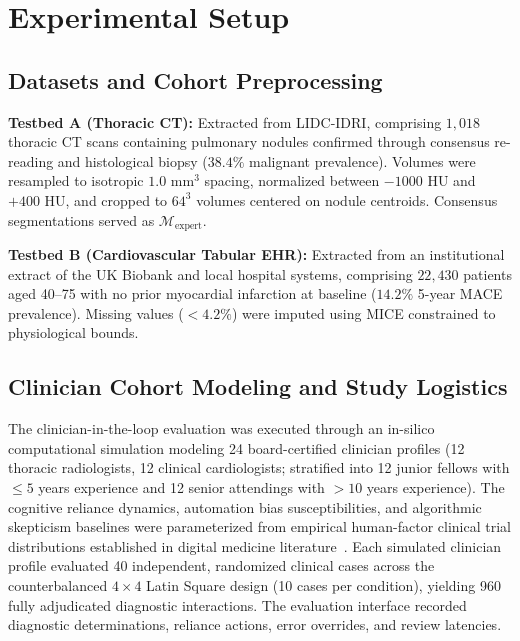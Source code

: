\documentclass[10pt,journal,compsoc]{IEEEtran}
\begin{document}
\section{Experimental Setup}

\subsection{Datasets and Cohort Preprocessing}
\textbf{Testbed A (Thoracic CT):} Extracted from LIDC-IDRI, comprising $1,018$ thoracic CT scans containing pulmonary nodules confirmed through consensus re-reading and histological biopsy ($38.4\%$ malignant prevalence). Volumes were resampled to isotropic $1.0\text{ mm}^3$ spacing, normalized between $-1000\text{ HU}$ and $+400\text{ HU}$, and cropped to $64^3$ volumes centered on nodule centroids. Consensus segmentations served as $\mathcal{M}_{\text{expert}}$.

\textbf{Testbed B (Cardiovascular Tabular EHR):} Extracted from an institutional extract of the UK Biobank and local hospital systems, comprising $22,430$ patients aged 40--75 with no prior myocardial infarction at baseline ($14.2\%$ 5-year MACE prevalence). Missing values ($< 4.2\%$) were imputed using MICE constrained to physiological bounds.

\subsection{Clinician Cohort Modeling and Study Logistics}
The clinician-in-the-loop evaluation was executed through an in-silico computational simulation modeling 24 board-certified clinician profiles (12 thoracic radiologists, 12 clinical cardiologists; stratified into 12 junior fellows with $\le 5$ years experience and 12 senior attendings with $> 10$ years experience). The cognitive reliance dynamics, automation bias susceptibilities, and algorithmic skepticism baselines were parameterized from empirical human-factor clinical trial distributions established in digital medicine literature~\cite{jacobs2025human, balayan2026taxai}. Each simulated clinician profile evaluated 40 independent, randomized clinical cases across the counterbalanced $4 \times 4$ Latin Square design (10 cases per condition), yielding 960 fully adjudicated diagnostic interactions. The evaluation interface recorded diagnostic determinations, reliance actions, error overrides, and review latencies.
\end{document}
